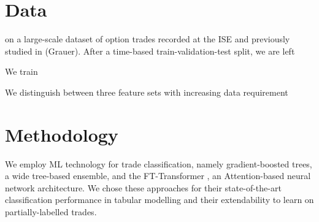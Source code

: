










\section{Data}

on a large-scale dataset of option trades recorded at the ISE and  previously studied in (Grauer). After a time-based train-validation-test split, we are left

We train

We distinguish between three feature sets with increasing data requirement


\section{Methodology}

We employ ML technology for trade classification, namely gradient-boosted trees, a wide tree-based ensemble, and the FT-Transformer \autocite{gorishniyRevisitingDeepLearning2021}, an Attention-based neural network architecture. We chose these approaches for their state-of-the-art classification performance in tabular modelling \autocites[][]{gorishniyRevisitingDeepLearning2021}[][]{grinsztajnWhyTreebasedModels2022} and their extendability to learn on partially-labelled trades.



